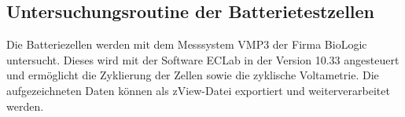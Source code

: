 \documentclass[a4paper, 11pt, headsepline,footsepline,twoside,abstract]{scrbook}
\begin{document}
\subsection{Untersuchungsroutine der Batterietestzellen} %
%
Die Batteriezellen werden mit dem Messsystem VMP3 der Firma BioLogic untersucht. Dieses wird mit der Software ECLab in der Version 10.33 angesteuert und ermöglicht die Zyklierung der Zellen sowie die zyklische Voltametrie. Die aufgezeichneten Daten können als zView-Datei exportiert und weiterverarbeitet werden.

\end{document}

